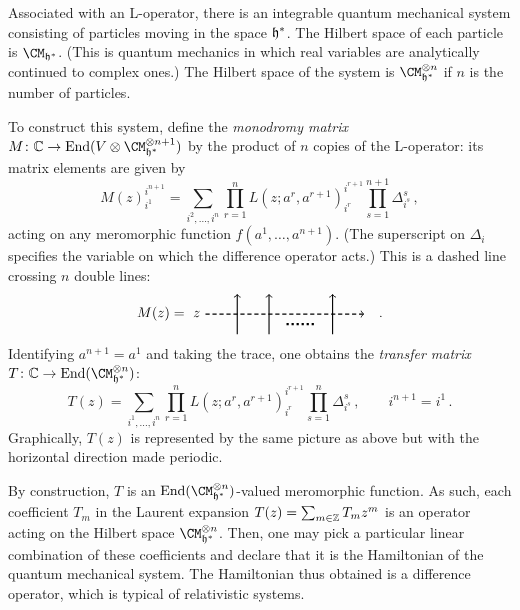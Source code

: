 Associated with an L-operator, there is an integrable quantum
mechanical system consisting of particles moving in the space $\mathfrak{h}^*$.
The Hilbert space of each particle is $\CM_{\hf^*}$.  (This is quantum
mechanics in which real variables are analytically continued to
complex ones.) The Hilbert space of the system is
$\CM_{\hf^*}^{\otimes n}$ if $n$ is the number of particles.

To construct this system, define the \emph{monodromy matrix}
$M\colon \C \to \End(V \otimes \CM_{\hf^*}^{\otimes n + 1})$ by the
product of $n$ copies of the L-operator: its matrix elements are given
by
\begin{equation}
  M(z)^{i^{n+1}}_{i^1}
  =
  \sum_{i^2, \dotsc, i^n}
  \prod_{r=1}^n
  L(z; a^r,a^{r+1})^{i^{r+1}}_{i^r}
  \prod_{s=1}^{n+1} \Delta_{i^s}^s \,,
\end{equation}
acting on any meromorphic function $f(a^1, \dotsc, a^{n+1})$.  (The
superscript on $\Delta_i$ specifies the variable on which the
difference operator acts.)  This is a dashed line crossing $n$ double
lines:
\begin{equation}
  M(z)
  =
  \begin{tikzpicture}[xscale=0.8, yscale=0.5, baseline=(x.base)]
    \node (x) at (0,0) {\vphantom{x}};

    \draw[thick, densely dashed, ->] (0,0) node[left] {$z$} -- (5,0);
    \draw[thick, ->] (1,-1) -- +(90:2);
    \draw[thick, ->] (2,-1) -- +(90:2);

    \draw[ultra thick, dotted, -] (2.55,-0.5) -- (3.45,-0.5);

    \draw[thick, ->] (4,-1) -- +(90:2);
  \end{tikzpicture}
  \quad .
\end{equation}
Identifying $a^{n+1} = a^1$ and taking the trace, one
obtains the \emph{transfer matrix}
$T\colon \C \to \End(\CM_{\hf^*}^{\otimes n})$:
\begin{equation}
  T(z)
  =
  \sum_{i^1, \dotsc, i^n}
  \prod_{r=1}^n
  L(z; a^r,a^{r+1})^{i^{r+1}}_{i^r}
  \prod_{s=1}^n \Delta_{i^s}^s
  \,,
  \qquad
  i^{n+1} = i^1 \,.
\end{equation}
Graphically, $T(z)$ is represented by the same picture as above but
with the horizontal direction made periodic.

By construction, $T$ is an $\End(\CM_{\hf^*}^{\otimes n})$-valued
meromorphic function.  As such, each coefficient $T_m$ in the Laurent
expansion $T(z) = \sum_{m \in \mathbb{Z}} T_m z^m$ is an operator acting on
the Hilbert space $\CM_{\hf^*}^{\otimes n}$.  Then, one may pick a
particular linear combination of these coefficients and declare that
it is the Hamiltonian of the quantum mechanical system.  The
Hamiltonian thus obtained is a difference operator, which is typical
of relativistic systems.

